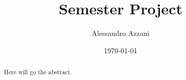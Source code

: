 \documentclass[12pt,a4paper]{report}
\title{Semester Project}
\author{Alessandro Azzani}
\date{\today}
\theoremstyle{definition}
\begin{document}
\maketitle


\begin{abstract}
    Here will go the abstract.
\end{abstract}


\tableofcontents











\printbibliography[heading=bibintoc]
\end{document}
